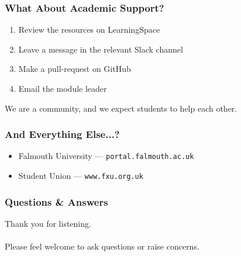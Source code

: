 \begin{frame}
	\frametitle{What About Academic Support?}	
	\begin{enumerate}
		\item Review the resources on LearningSpace
		\item Leave a message in the relevant Slack channel
		\item Make a pull-request on GitHub
		\item Email the module leader
	\end{enumerate}
	
	We are a community, and we expect students to help each other.
\end{frame}

\begin{frame}
	\frametitle{And Everything Else...?}	
	\begin{itemize}
		\item Falmouth University --- \texttt{portal.falmouth.ac.uk}
		\item Student Union --- \texttt{www.fxu.org.uk}
	\end{itemize}
\end{frame}

\begin{frame}
	\frametitle{Questions \& Answers}	
	\begin{center}
		Thank you for listening. 
		\\~\\
		Please feel welcome to ask questions or raise concerns.
	\end{center}
\end{frame}


